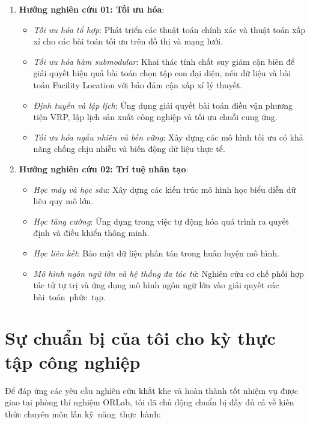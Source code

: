 \begin{enumerate}[itemsep=1pt, parsep=0pt, topsep=2pt]
    \item \textbf{Hướng nghiên cứu 01: Tối ưu hóa}:
    \begin{itemize}[itemsep=1pt, parsep=0pt, topsep=1pt]
        \item \textit{Tối ưu hóa tổ hợp}: Phát triển các thuật toán chính xác và thuật toán xấp xỉ cho các bài toán tối ưu trên đồ thị và mạng lưới.
        \item \textit{Tối ưu hóa hàm submodular}: Khai thác tính chất suy giảm cận biên để giải quyết hiệu quả bài toán chọn tập con đại diện, nén dữ liệu và bài toán Facility Location với bảo đảm cận xấp xỉ lý thuyết.
        \item \textit{Định tuyến và lập lịch}: Ứng dụng giải quyết bài toán điều vận phương tiện VRP, lập lịch sản xuất công nghiệp và tối ưu chuỗi cung ứng.
        \item \textit{Tối ưu hóa ngẫu nhiên và bền vững}: Xây dựng các mô hình tối ưu có khả năng chống chịu nhiễu và biến động dữ liệu thực tế.
    \end{itemize}
    \item \textbf{Hướng nghiên cứu 02: Trí tuệ nhân tạo}:
    \begin{itemize}[itemsep=1pt, parsep=0pt, topsep=1pt]
        \item \textit{Học máy và học sâu}: Xây dựng các kiến trúc mô hình học biểu diễn dữ liệu quy mô lớn.
        \item \textit{Học tăng cường}: Ứng dụng trong việc tự động hóa quá trình ra quyết định và điều khiển thông minh.
        \item \textit{Học liên kết}: Bảo mật dữ liệu phân tán trong huấn luyện mô hình.
        \item \textit{Mô hình ngôn ngữ lớn và hệ thống đa tác tử}: Nghiên cứu cơ chế phối hợp tác tử tự trị và ứng dụng mô hình ngôn ngữ lớn vào giải quyết các bài~toán~phức~tạp.
    \end{itemize}
\end{enumerate}

\section{Sự chuẩn bị của tôi cho kỳ thực tập công nghiệp}
\label{sec:chuan_bi_thuc_tap}

Để đáp ứng các yêu cầu nghiên cứu khắt khe và hoàn thành tốt nhiệm vụ được giao tại phòng thí nghiệm ORLab, tôi đã chủ động chuẩn bị đầy đủ cả về kiến thức chuyên môn lẫn kỹ~năng~thực~hành:

